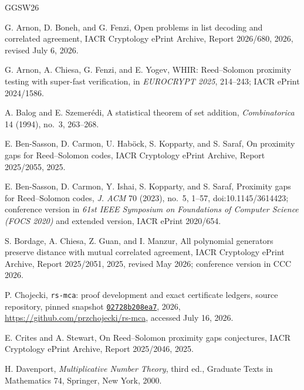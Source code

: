 \documentclass[11pt,a4paper]{amsart}
\numberwithin{equation}{section}
\theoremstyle{remark}
\begin{document}
\begin{thebibliography}{GGSW26}

G. Arnon, D. Boneh, and G. Fenzi,
\newblock Open problems in list decoding and correlated agreement,
\newblock IACR Cryptology ePrint Archive, Report 2026/680, 2026,
revised July 6, 2026.

G. Arnon, A. Chiesa, G. Fenzi, and E. Yogev,
\newblock WHIR: Reed--Solomon proximity testing with super-fast verification,
\newblock in \emph{EUROCRYPT 2025}, 214--243;
IACR ePrint 2024/1586.

A. Balog and E. Szemer\'edi,
\newblock A statistical theorem of set addition,
\newblock \emph{Combinatorica} 14 (1994), no.~3, 263--268.

E. Ben-Sasson, D. Carmon, U. Hab\"ock, S. Kopparty, and S. Saraf,
\newblock On proximity gaps for Reed--Solomon codes,
\newblock IACR Cryptology ePrint Archive, Report 2025/2055, 2025.

E. Ben-Sasson, D. Carmon, Y. Ishai, S. Kopparty, and S. Saraf,
\newblock Proximity gaps for Reed--Solomon codes,
\newblock \emph{J. ACM} 70 (2023), no.~5, 1--57,
\newblock doi:10.1145/3614423; conference version in
\emph{61st IEEE Symposium on Foundations of Computer Science
(FOCS 2020)} and extended version, IACR ePrint 2020/654.

S. Bordage, A. Chiesa, Z. Guan, and I. Manzur,
\newblock All polynomial generators preserve distance with mutual
correlated agreement,
\newblock IACR Cryptology ePrint Archive, Report 2025/2051, 2025,
revised May 2026; conference version in CCC 2026.

P. Chojecki,
\newblock \texttt{rs-mca}: proof development and exact certificate ledgers,
\newblock source repository, pinned snapshot
\href{https://github.com/przchojecki/rs-mca/tree/02728b208ea785d02115ea967236aebf653b31ec}{\texttt{02728b208ea7}}, 2026,
\newblock \url{https://github.com/przchojecki/rs-mca}, accessed July 16, 2026.

E. Crites and A. Stewart,
\newblock On Reed--Solomon proximity gaps conjectures,
\newblock IACR Cryptology ePrint Archive, Report 2025/2046, 2025.

H. Davenport,
\newblock \emph{Multiplicative Number Theory}, third ed.,
\newblock Graduate Texts in Mathematics 74, Springer, New York, 2000.


\end{thebibliography}
\end{document}
